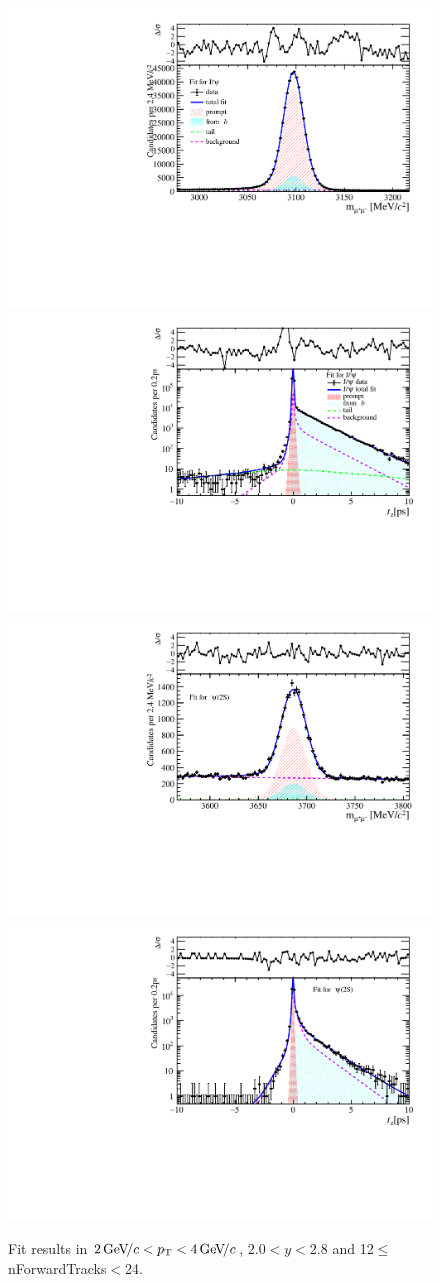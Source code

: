 \begin{figure}[H]
\begin{center}
\includegraphics[width=0.47\linewidth]{pdf/Jpsi/drawmassF/n2y1pt2.pdf}
\includegraphics[width=0.47\linewidth]{pdf/Jpsi/2DFitF/n2y1pt2.pdf}
\vspace*{-0.5cm}
\includegraphics[width=0.47\linewidth]{pdf/Psi2S/drawmassF/n2y1pt2.pdf}
\includegraphics[width=0.47\linewidth]{pdf/Psi2S/2DFitF/n2y1pt2.pdf}
\vspace*{-0.5cm}
\end{center}
\caption{Fit results in $2\text{\,Ge\kern -0.1em V\!/}c<p_{\mathrm{T}}<4\text{\,Ge\kern -0.1em V\!/}c$, $2.0<y<2.8$ and 12$\leq$nForwardTracks$<$24.}
\label{Fitn2y1pt2}
\end{figure}
